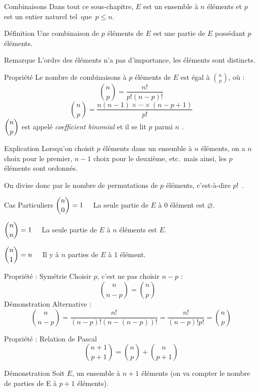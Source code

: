 \documentclass{coursbook}
\begin{document}
    \begin{Gpartie}{Combinaisons}
        Dans tout ce sous-chapitre, $E$ est un ensemble à $n$ éléments et $p$ est un entier naturel tel~que~$p\leq n$.
        \begin{Spartie}{Définition}
            Une combinaison de $p$ éléments de $E$ est une partie de $E$ possédant $p$ éléments.
            \begin{SSpartie}{Remarque}
                L'ordre des éléments n'a pas d'importance, les éléments sont distincts.
            \end{SSpartie}
        \end{Spartie}
        \begin{Spartie}{Propriété}
            Le nombre de combinaisons à $p$ éléments de $E$ est égal à $\binom{n}{p}$, où :
            \[\binom{n}{p}=\dfrac{n!}{p!(n-p)!}\]
            \[\binom{n}{p}=\dfrac{n(n-1)\times\dotsb\times(n-p+1)}{p!}\]
            $\dbinom{n}{p}$ est appelé \emph{coefficient binomial} et il se lit \og $p$ parmi $n$ \fg{}.
            \begin{SSpartie}{Explication}
                Lorsqu'on choisit $p$ éléments dans un ensemble à $n$ éléments, on a $n$ choix pour le premier, $n-1$ choix pour le deuxième, etc.\ mais ainsi, les $p$ éléments sont ordonnés.

                On divise donc par le nombre de permutations de $p$ éléments, c'est-à-dire $p!$~.
            \end{SSpartie}
            \begin{SSpartie}{Cas Particuliers}
                $\dbinom{n}{0}=1\quad$ La seule partie de $E$ à $0$ élément est $\varnothing$.

                $\dbinom{n}{n}=1\quad$ La seule partie de $E$ à $n$ éléments est $E$.

                $\dbinom{n}{1}=n\quad$ Il y à $n$ parties de $E$ à $1$ élément.
            \end{SSpartie}
        \end{Spartie}
        \begin{Spartie}{Propriété : Symétrie}
            Choisir $p$, c'est ne pas choisir $n-p$ :
            \[\binom{n}{n-p}=\binom{n}{p}\quad\]
            Démonstration Alternative : 
            \[\binom{n}{n-p}=\dfrac{n!}{(n-p)!(n-(n-p))!}=\dfrac{n!}{(n-p)!p!}=\binom{n}{p}\]
        \end{Spartie}
        \begin{Spartie}{Propriété : Relation de Pascal}
            \[\binom{n+1}{p+1}=\binom{n}{p}+\binom{n}{p+1}\]
            \begin{SSpartie}{Démonstration}
                Soit $E$, un ensemble à $n+1$ éléments (on va compter le nombre de parties de E à $p+1$ éléments).


\end{SSpartie}
\end{Spartie}
\end{Gpartie}
\end{document}
